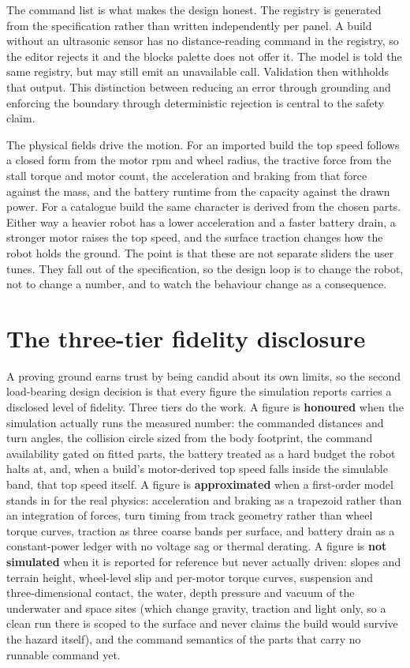 \documentclass[11pt,a4paper]{report}
\begin{document}
The command list is what makes the design honest. The registry is generated from the specification rather than written independently per panel. A build without an ultrasonic sensor has no distance-reading command in the registry, so the editor rejects it and the blocks palette does not offer it. The model is told the same registry, but may still emit an unavailable call. Validation then withholds that output. This distinction between reducing an error through grounding and enforcing the boundary through deterministic rejection is central to the safety claim.

The physical fields drive the motion. For an imported build the top speed follows a closed form from the motor rpm and wheel radius, the tractive force from the stall torque and motor count, the acceleration and braking from that force against the mass, and the battery runtime from the capacity against the drawn power. For a catalogue build the same character is derived from the chosen parts. Either way a heavier robot has a lower acceleration and a faster battery drain, a stronger motor raises the top speed, and the surface traction changes how the robot holds the ground. The point is that these are not separate sliders the user tunes. They fall out of the specification, so the design loop is to change the robot, not to change a number, and to watch the behaviour change as a consequence.

\section{The three-tier fidelity disclosure}
\label{sec:fidelity}
A proving ground earns trust by being candid about its own limits, so the second load-bearing design decision is that every figure the simulation reports carries a disclosed level of fidelity. Three tiers do the work. A figure is \textbf{honoured} when the simulation actually runs the measured number: the commanded distances and turn angles, the collision circle sized from the body footprint, the command availability gated on fitted parts, the battery treated as a hard budget the robot halts at, and, when a build's motor-derived top speed falls inside the simulable band, that top speed itself. A figure is \textbf{approximated} when a first-order model stands in for the real physics: acceleration and braking as a trapezoid rather than an integration of forces, turn timing from track geometry rather than wheel torque curves, traction as three coarse bands per surface, and battery drain as a constant-power ledger with no voltage sag or thermal derating. A figure is \textbf{not simulated} when it is reported for reference but never actually driven: slopes and terrain height, wheel-level slip and per-motor torque curves, suspension and three-dimensional contact, the water, depth pressure and vacuum of the underwater and space sites (which change gravity, traction and light only, so a clean run there is scoped to the surface and never claims the build would survive the hazard itself), and the command semantics of the parts that carry no runnable command yet.
\end{document}
